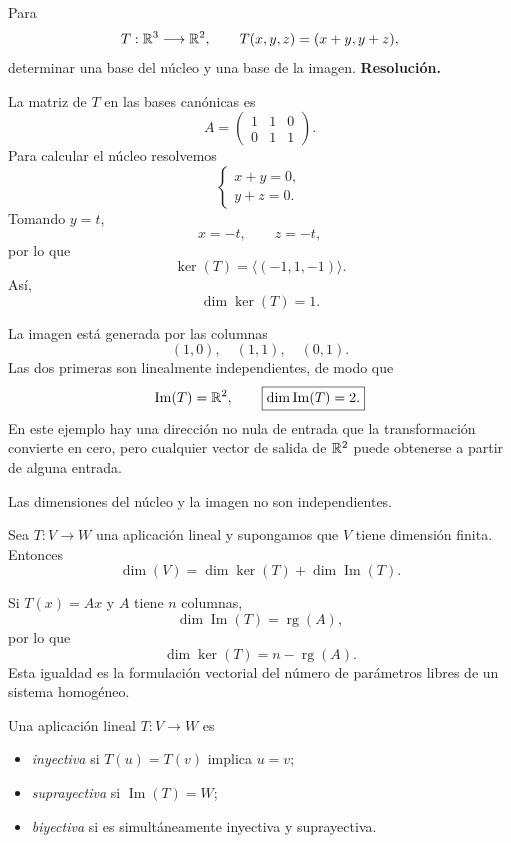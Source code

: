 \begin{solvedexercise}
Para
\[
T:\mathbb{R}^3\longrightarrow\mathbb{R}^2,
\qquad
T(x,y,z)=(x+y,y+z),
\]
determinar una base del núcleo y una base de la imagen.
\tcblower
\textbf{Resolución.}\par\smallskip
La matriz de $T$ en las bases canónicas es
\[
A=
\begin{pmatrix}
1&1&0\\
0&1&1
\end{pmatrix}.
\]
Para calcular el núcleo resolvemos
\[
\begin{cases}
x+y=0,\\
y+z=0.
\end{cases}
\]
Tomando $y=t$,
\[
x=-t,
\qquad
z=-t,
\]
por lo que
\[
\ker(T)=\langle(-1,1,-1)\rangle.
\]
Así,
\[
\boxed{\dim\ker(T)=1.}
\]

La imagen está generada por las columnas
\[
(1,0),\quad(1,1),\quad(0,1).
\]
Las dos primeras son linealmente independientes, de modo que
\[
\operatorname{Im}(T)=\mathbb{R}^2,
\qquad
\boxed{\dim\operatorname{Im}(T)=2.}
\]
En este ejemplo hay una dirección no nula de entrada que la transformación convierte en cero, pero cualquier vector de salida de $\mathbb{R}^2$ puede obtenerse a partir de alguna entrada.
\end{solvedexercise}

Las dimensiones del núcleo y la imagen no son independientes.

\begin{theorem}
Sea $T:V\to W$ una aplicación lineal y supongamos que $V$ tiene dimensión finita. Entonces
\[
\boxed{
\dim(V)=\dim\ker(T)+\dim\operatorname{Im}(T).
}
\]
\end{theorem}

Si $T(x)=Ax$ y $A$ tiene $n$ columnas,
\[
\dim\operatorname{Im}(T)=\operatorname{rg}(A),
\]
por lo que
\[
\boxed{
\dim\ker(T)=n-\operatorname{rg}(A).
}
\]
Esta igualdad es la formulación vectorial del número de parámetros libres de un sistema homogéneo.

\begin{definition}
Una aplicación lineal $T:V\to W$ es
\begin{itemize}
\item \emph{inyectiva} si $T(u)=T(v)$ implica $u=v$;
\item \emph{suprayectiva} si $\operatorname{Im}(T)=W$;
\item \emph{biyectiva} si es simultáneamente inyectiva y suprayectiva.
\end{itemize}
\end{definition}


